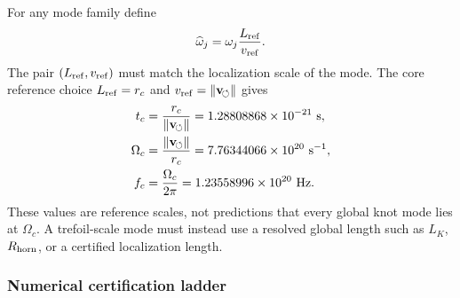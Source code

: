         For any mode family define
        \begin{equation}
            \widehat\omega_j
            =
            \omega_j
            \frac{L_{\rm ref}}{v_{\rm ref}}.
            \label{eq:rt_qss_dimensionless_frequency}
        \end{equation}
        The pair \((L_{\rm ref},v_{\rm ref})\) must match the localization scale of the
        mode.  The core reference choice
        \(L_{\rm ref}=r_c\) and \(v_{\rm ref}=\lVert\mathbf{v}_{\!\boldsymbol{\circlearrowleft}}\rVert\) gives
        \begin{align}
            t_c
            &=
            \frac{r_c}{\lVert\mathbf{v}_{\!\boldsymbol{\circlearrowleft}}\rVert}
            =
            1.28808868\times10^{-21}\ \mathrm{s},
            \\
            \Omega_c
            &=
            \frac{\lVert\mathbf{v}_{\!\boldsymbol{\circlearrowleft}}\rVert}{r_c}
            =
            7.76344066\times10^{20}\ \mathrm{s^{-1}},
            \\
            f_c
            &=
            \frac{\Omega_c}{2\pi}
            =
            1.23558996\times10^{20}\ \mathrm{Hz}.
            \label{eq:rt_qss_canonical_scales}
        \end{align}
        These values are reference scales, not predictions that every global knot mode
        lies at \(\Omega_c\).  A trefoil-scale mode must instead use a resolved global
        length such as \(L_K\), \(R_{\rm horn}\), or a certified localization length.

    \subsubsection*{Numerical certification ladder}

